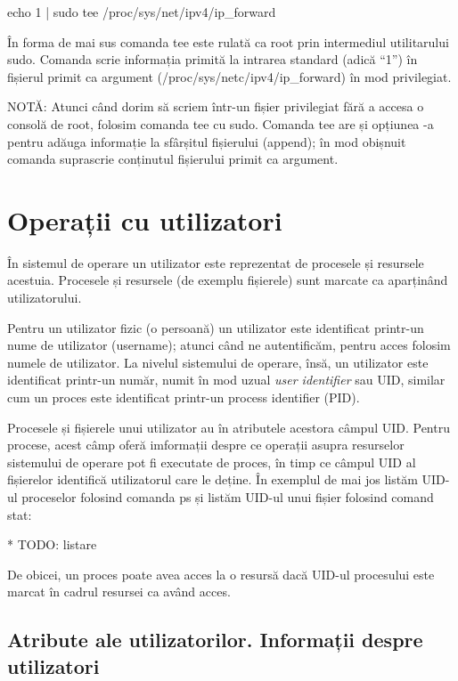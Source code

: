 \begin{screen}
echo 1 | sudo tee /proc/sys/net/ipv4/ip_forward
\end{screen}

În forma de mai sus comanda tee este rulată ca root prin intermediul
utilitarului sudo. Comanda scrie informația primită la intrarea standard (adică
“1”) în fișierul primit ca argument (/proc/sys/netc/ipv4/ip_forward) în mod
privilegiat.

NOTĂ: Atunci când dorim să scriem într-un fișier privilegiat fără a accesa o
consolă de root, folosim comanda tee cu sudo. Comanda tee are și opțiunea -a
pentru adăuga informație la sfârșitul fișierului (append); în mod obișnuit
comanda suprascrie conținutul fișierului primit ca argument.

\section{Operații cu utilizatori}
\label{sec:users-ops}

În sistemul de operare un utilizator este reprezentat de procesele și resursele
acestuia. Procesele și resursele (de exemplu fișierele) sunt marcate ca
aparținând utilizatorului.

Pentru un utilizator fizic (o persoană) un utilizator este identificat printr-un
nume de utilizator (username); atunci când ne autentificăm, pentru acces folosim
numele de utilizator. La nivelul sistemului de operare, însă, un utilizator este
identificat printr-un număr, numit în mod uzual \textit{user identifier} sau
UID, similar cum un proces este identificat printr-un process identifier (PID).

Procesele și fișierele unui utilizator au în atributele acestora câmpul UID.
Pentru procese, acest câmp oferă imformații despre ce operații asupra resurselor
sistemului de operare pot fi executate de proces, în timp ce câmpul UID al
fișierelor identifică utilizatorul care le deține. În exemplul de mai jos listăm
UID-ul proceselor folosind comanda ps și listăm UID-ul unui fișier folosind
comand stat:

* TODO: listare

De obicei, un proces poate avea acces la o resursă dacă UID-ul procesului este
marcat în cadrul resursei ca având acces.

\subsection{Atribute ale utilizatorilor. Informații despre utilizatori}
\label{sec:users-ops-atribute}

